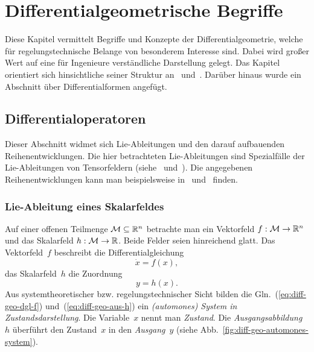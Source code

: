
\chapter{Differentialgeometrische Begriffe\label{chap:Diff-Geo}}

Diese Kapitel vermittelt Begriffe und Konzepte der Differentialgeometrie,
welche für regelungstechnische Belange von besonderem Interesse sind.
Dabei wird großer Wert auf eine für Ingenieure verständliche Darstellung
gelegt. Das Kapitel orientiert sich hinsichtliche seiner Struktur
an~\cite[Kap.~{1}]{isidori3} und~\cite{jakubczyk2001course}. Darüber
hinaus wurde ein Abschnitt über Differentialformen angefügt.

\section{Differentialoperatoren\label{sec:Lie-Ableitungen}}

Dieser Abschnitt widmet sich Lie-Ableitungen und den darauf aufbauenden
Reihenentwicklungen. Die hier betrachteten Lie-Ableitungen sind Spezialfälle
der Lie-Ableitungen von Tensorfeldern (siehe~\cite[Kapitel~{12}]{oloff2004}
und~\cite{lee2006}). Die angegebenen Reihenentwicklungen kann man
beispielsweise in~\cite{krener85} und~\cite[Abschnitt~{4.4}]{sontag98}
finden.

\subsection{Lie-Ableitung eines Skalarfeldes\label{subsec:Lie-Ableitung-Skalarfeld}}

Auf einer offenen Teilmenge $\mathcal{M}\subseteq{\mathbb{R}}^{n}$ betrachte
man ein Vektorfeld $f:\mathcal{M}\to{\mathbb{R}}^{n}$ und das Skalarfeld $h:\mathcal{M}\to{\mathbb{R}}$.
Beide Felder seien hinreichend glatt. Das Vektorfeld~$f$ beschreibt
die Differentialgleichung
\begin{equation}
\dot{x}=f(x),\label{eq:diff-geo-dgl-f}
\end{equation}
das Skalarfeld~$h$ die Zuordnung 
\begin{equation}
y=h(x).\label{eq:diff-geo-aus-h}
\end{equation}
Aus systemtheoretischer bzw. regelungstechnischer Sicht bilden die
Gln.~(\ref{eq:diff-geo-dgl-f}) und~(\ref{eq:diff-geo-aus-h}) ein
\emph{(automones) System in Zustandsdarstellung}. Die Variable~$x$
nennt man \emph{Zustand}. Die \emph{Ausgangsabbildung}~$h$ überführt
den Zustand~$x$ in den \emph{Ausgang}~$y$ (siehe Abb.~\ref{fig:diff-geo-automones-system}).


